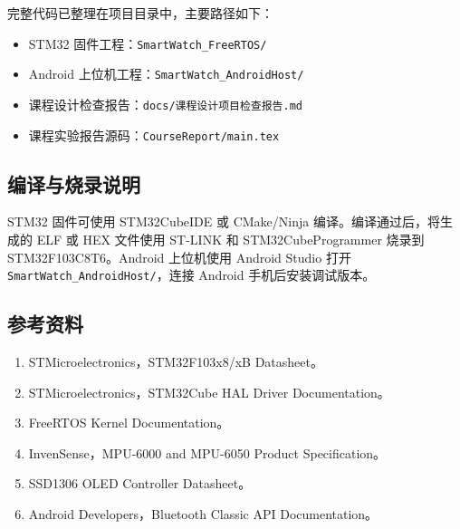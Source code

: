 \documentclass[UTF8,fontset=windows,12pt,a4paper]{ctexart}
\begin{document}
完整代码已整理在项目目录中，主要路径如下：
\begin{itemize}[leftmargin=2em]
  \item STM32 固件工程：\texttt{SmartWatch\_FreeRTOS/}
  \item Android 上位机工程：\texttt{SmartWatch\_AndroidHost/}
  \item 课程设计检查报告：\texttt{docs/课程设计项目检查报告.md}
  \item 课程实验报告源码：\texttt{CourseReport/main.tex}
\end{itemize}

\subsection{编译与烧录说明}

STM32 固件可使用 STM32CubeIDE 或 CMake/Ninja 编译。编译通过后，将生成的 ELF 或 HEX 文件使用 ST-LINK 和 STM32CubeProgrammer 烧录到 STM32F103C8T6。Android 上位机使用 Android Studio 打开 \texttt{SmartWatch\_AndroidHost/}，连接 Android 手机后安装调试版本。

\subsection{参考资料}

\begin{enumerate}[leftmargin=2em]
  \item STMicroelectronics，STM32F103x8/xB Datasheet。
  \item STMicroelectronics，STM32Cube HAL Driver Documentation。
  \item FreeRTOS Kernel Documentation。
  \item InvenSense，MPU-6000 and MPU-6050 Product Specification。
  \item SSD1306 OLED Controller Datasheet。
  \item Android Developers，Bluetooth Classic API Documentation。
\end{enumerate}
\end{document}
